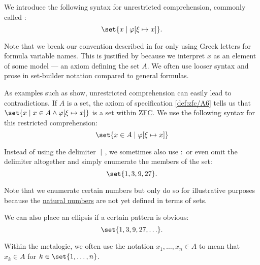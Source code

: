 \begin{definition}\label{def:set_builder_notation}
  We introduce the following syntax for unrestricted comprehension, commonly called :
  \begin{equation*}
    \set{ x \given \varphi[\xi \mapsto x] }.
  \end{equation*}

  Note that we break our convention described in  for only using Greek letters for formula variable names. This is justified by  because we interpret \( x \) as an element of some model --- an axiom defining the set \( A \). We often use looser syntax and prose in set-builder notation compared to general formulas.

  As examples such as  show, unrestricted comprehension can easily lead to contradictions. If \( A \) is a set, the axiom of specification \ref{def:zfc/A6} tells us that \( \set{ x \given x \in A \wedge \varphi[\xi \mapsto x] } \) is a set within \hyperref[def:zfc]{ZFC}. We use the following syntax for this restricted comprehension:
  \begin{equation*}
    \set{ x \in A \given \varphi[\xi \mapsto x] }
  \end{equation*}

  Instead of using the delimiter \( \given \), we sometimes also use \( : \) or even omit the delimiter altogether and simply enumerate the members of the set:
  \begin{equation*}
    \set{ 1, 3, 9, 27 }.
  \end{equation*}

  Note that we enumerate certain numbers but only do so for illustrative purposes because the \hyperref[def:set_of_natural_numbers]{natural numbers} are not yet defined in terms of sets.

  We can also place an ellipsis if a certain pattern is obvious:
  \begin{equation*}
    \set{ 1, 3, 9, 27, \ldots }.
  \end{equation*}
\end{definition}

\begin{remark}\label{rem:multile_set_membership_shorthand}
  Within the metalogic, we often use the notation \( x_1, \ldots, x_n \in A \) to mean that \( x_k \in A \) for \( k \in \set{ 1, \ldots, n } \).
\end{remark}

